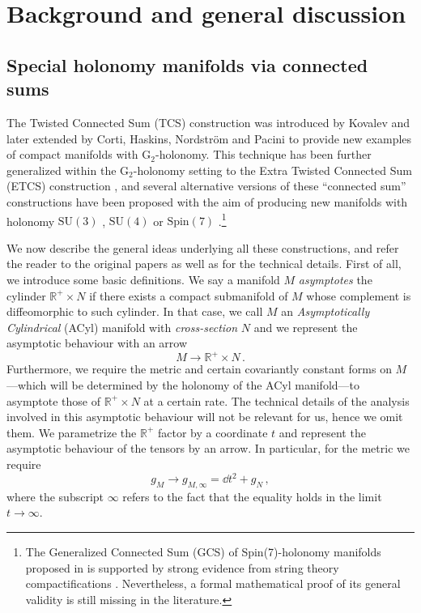 \documentclass{pspum-l}
\newcommand*\R{\mathbb{R}}
\theoremstyle{definition}
\theoremstyle{remark}
\numberwithin{equation}{section}
\begin{document}
\section{Background and general discussion}

\label{sec:Background}

\subsection{Special holonomy manifolds via connected sums}

\label{sec:introConnSum}

The Twisted Connected Sum (TCS) construction was introduced by Kovalev \cite{Kovalev:2003} and later extended by Corti, Haskins, Nordstr\"om and Pacini \cite{Corti:2012, Corti:2012kd} to provide new examples of compact manifolds with G$_2$-holonomy. This technique has been further generalized within the G$_2$-holonomy setting to the Extra Twisted Connected Sum (ETCS) construction \cite{Crowley:2015ctv, Nordstrom:2018cli, Goette:2020}, and several alternative versions of these ``connected sum'' constructions have been proposed with the aim of producing new manifolds with holonomy $\text{SU}(3)$ \cite{Doi:2013}, $\text{SU}(4)$ \cite{Doi:2015} or $\text{Spin}(7)$ \cite{Braun:2018joh, Doi:2019}.\footnote{The Generalized Connected Sum (GCS) of Spin(7)-holonomy manifolds proposed in \cite{Braun:2018joh} is supported by strong evidence from string theory compactifications \cite{Braun:2018joh, Cvetic:2020piw, Fiset:2021ruv}. Nevertheless, a formal mathematical proof of its general validity is still missing in the literature.}

We now describe the general ideas underlying all these constructions, and refer the reader to the original papers as well as \cite{Langlais:2023pmo} for the technical details. First of all, we introduce some basic definitions. We say a manifold $M$ \emph{asymptotes} the cylinder $\R^+\times N$ if there exists a compact submanifold of $M$ whose complement is diffeomorphic to such cylinder. In that case, we call $M$ an \emph{Asymptotically Cylindrical} (ACyl) manifold with \emph{cross-section} $N$ and we represent the asymptotic behaviour with an arrow
\begin{equation}
    M\longrightarrow\R^+\times N \, .
\end{equation}
Furthermore, we require the metric and certain covariantly constant forms on $M$---which will be determined by the holonomy of the ACyl manifold---to asymptote those of $\R^+\times N$ at a certain rate.  The technical details of the analysis involved in this asymptotic behaviour will not be relevant for us, hence we omit them. We parametrize the $\R^+$ factor by a coordinate $t$ and represent the asymptotic behaviour of the tensors by an arrow. In particular, for the metric we require
\begin{equation}
    g_M \longrightarrow g_{M,\infty}=\dd t^2+g_N \, ,
\end{equation}
where the subscript $\infty$ refers to the fact that the equality holds in the limit $t\longrightarrow\infty$.
\end{document}
